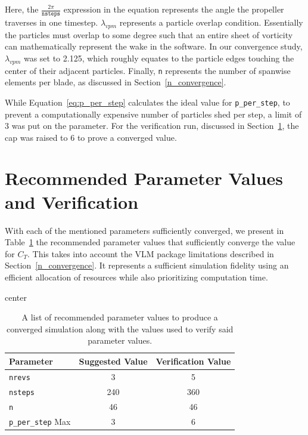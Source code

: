 \documentclass{article}
\begin{document}
Here, the $\frac{2 \pi}{\texttt{nsteps}}$ expression in the equation represents the angle the propeller traverses in one timestep.
$\lambda_{vpm}$ represents a particle overlap condition. Essentially the particles must overlap to some degree such that an entire sheet of vorticity can mathematically represent the wake in the software.
In our convergence study, $\lambda_{vpm}$ was set to 2.125, which roughly equates to the particle edges touching the center of their adjacent particles.
Finally, \texttt{n} represents the number of spanwise elements per blade, as discussed in Section~\ref{n_convergence}.

While Equation~\ref{eq:p_per_step} calculates the ideal value for \texttt{p\_per\_step}, to prevent a computationally expensive number of particles shed per step, a limit of 3 was put on the parameter.
For the verification run, discussed in Section~\ref{Verification}, the cap was raised to 6 to prove a converged value. 

\section{Recommended Parameter Values and Verification}\label{Verification}
With each of the mentioned parameters sufficiently converged, we present in Table~\ref{tab:suggested} the recommended parameter values that sufficiently converge the value for $C_T$.
This takes into account the VLM package limitations described in Section~\ref{n_convergence}. It represents a sufficient simulation fidelity using an efficient allocation of resources while also prioritizing computation time.
\begin{table}[H]
    \centering
    \caption{A list of recommended parameter values to produce a converged simulation along with the values used to verify said parameter values.}\label{tab:suggested}
    \begin{adjustbox}{center}
    \begin{tabular}{l c c}
        \toprule
        \textbf{Parameter} & \textbf{Suggested Value} & \textbf{Verification Value} \\
        \midrule
        \texttt{nrevs} & 3 &  5 \\
        \texttt{nsteps} & 240 & 360 \\
        \texttt{n} & 46  & 46 \\
        \texttt{p\_per\_step} Max & 3 & 6 \\
        \bottomrule
    \end{tabular}
    \end{adjustbox}
\end{table}
\end{document}
